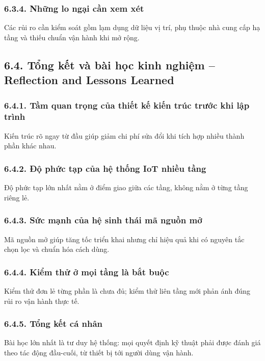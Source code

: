 \documentclass[a4paper]{extarticle}
\begin{document}
\subsubsection{6.3.4. Những lo ngại cần xem xét}

Các rủi ro cần kiểm soát gồm lạm dụng dữ liệu vị trí, phụ thuộc nhà cung cấp hạ tầng và thiếu chuẩn vận hành khi mở rộng.

\subsection{6.4. Tổng kết và bài học kinh nghiệm -- Reflection and Lessons Learned}

\subsubsection{6.4.1. Tầm quan trọng của thiết kế kiến trúc trước khi lập trình}

Kiến trúc rõ ngay từ đầu giúp giảm chi phí sửa đổi khi tích hợp nhiều thành phần khác nhau.

\subsubsection{6.4.2. Độ phức tạp của hệ thống IoT nhiều tầng}

Độ phức tạp lớn nhất nằm ở điểm giao giữa các tầng, không nằm ở từng tầng riêng lẻ.

\subsubsection{6.4.3. Sức mạnh của hệ sinh thái mã nguồn mở}

Mã nguồn mở giúp tăng tốc triển khai nhưng chỉ hiệu quả khi có nguyên tắc chọn lọc và chuẩn hóa cách dùng.

\subsubsection{6.4.4. Kiểm thử ở mọi tầng là bắt buộc}

Kiểm thử đơn lẻ từng phần là chưa đủ; kiểm thử liên tầng mới phản ánh đúng rủi ro vận hành thực tế.

\subsubsection{6.4.5. Tổng kết cá nhân}

Bài học lớn nhất là tư duy hệ thống: mọi quyết định kỹ thuật phải được đánh giá theo tác động đầu-cuối, từ thiết bị tới người dùng vận hành.
\end{document}
